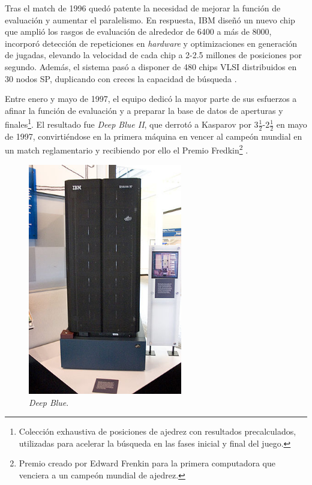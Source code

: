 \documentclass[a4paper, 12pt]{article}
\begin{document}
Tras el match de 1996 quedó patente la necesidad de mejorar la 
función de evaluación y aumentar el paralelismo. En respuesta, 
IBM diseñó un nuevo chip que amplió los rasgos de evaluación de 
alrededor de 6400 a más de 8000, incorporó detección de 
repeticiones en \emph{hardware} y optimizaciones en generación de 
jugadas, elevando la velocidad de cada chip a 2-2.5 millones de 
posiciones por segundo. Además, el sistema pasó a disponer de 
480 chips VLSI distribuidos en 30 nodos SP, duplicando con 
creces la capacidad de búsqueda \cite{campbell2002deep}.

Entre enero y mayo de 1997, el equipo dedicó la mayor parte de 
sus esfuerzos a afinar la función de evaluación y a preparar la 
base de datos de aperturas y finales\footnote{Colección exhaustiva de posiciones de ajedrez con resultados precalculados, utilizadas para acelerar la búsqueda en las fases inicial y final del juego.}. El resultado fue 
\textit{Deep Blue II}, que derrotó a Kasparov por 3\(\frac{1}{2}\)-2\(\frac{1}{2}\) en mayo
de 1997, convirtiéndose en la primera máquina en vencer al 
campeón mundial en un match reglamentario y recibiendo por 
ello el Premio Fredkin\footnote{Premio creado por Edward Frenkin para la primera computadora que venciera a un campeón mundial de ajedrez.} \cite{campbell2002deep}.



\begin{figure}[h]
    \centering
    \includegraphics[width=0.6\textwidth]{assets/deepblue.jpg}
    \caption{\textit{Deep Blue}.}
    \label{fig:deepblue}
\end{figure}
\end{document}
